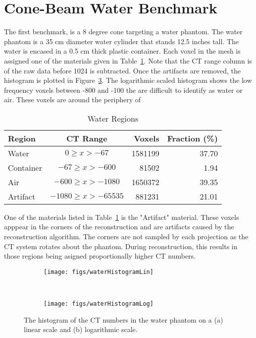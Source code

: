 \section{Cone-Beam Water Benchmark}\label{sec:cone1}

The first benchmark, is a 8 degree cone targeting a water phantom. The water phantom is a 35 cm diameter water cylinder that stands 12.5 inches tall. The water is encased in a 0.5 cm thick plastic container. Each voxel in the mesh is assigned one of the materials given in Table~\ref{tab:watermats}. Note that the CT range column is of the raw data before 1024 is subtracted. Once the artifacts are removed, the histogram is plotted in Figure~\ref{fig:waterHist}. The logarithmic scaled histogram shows the low frequency voxels between -800 and -100 the are difficult to identify as water or air. These voxels are around the periphery of 

\begin{table}[ht]
\caption{Water Regions}
\centering 
\begin{tabular}{l c r r}
\hline \hline   
Region    & CT Range & Voxels & Fraction (\%)\\ [0.5ex] 
\hline
Water     & $0 \geq x > -67$ & 1581199 & 37.70 \\
Container & $-67 \geq x > -600$ & 81502 & 1.94 \\
Air       & $-600 \geq x > -1080$ & 1650372  & 39.35 \\
Artifact  & $-1080 \geq x > -65535$ & 881231 & 21.01 \\  [1ex]
\hline
\end{tabular}
\label{tab:watermats}
\end{table}

One of the materials listed in Table~\ref{tab:watermats} is the "Artifact" material. These voxels apppear in the corners of the reconstruction and are artifacts caused by the reconstruction algorithm. The corners are not sampled by each projection as the CT system rotates about the phantom. During reconstruction, this results in those regions being asigned proportionally higher CT numbers.

\begin{figure}
    \centering
    \begin{subfigure}[b]{0.45\textwidth}
        \texttt{[image: figs/waterHistogramLin]}
        \caption{}
        \label{fig:waterHistLin}
    \end{subfigure}
    ~
    \begin{subfigure}[b]{0.45\textwidth}
        \texttt{[image: figs/waterHistogramLog]}
        \caption{}
        \label{fig:waterHistLog}
    \end{subfigure}
    \caption{The histogram of the CT numbers in the water phantom on a (a) linear scale and (b) logarithmic scale.}\label{fig:waterHist}
\end{figure}

